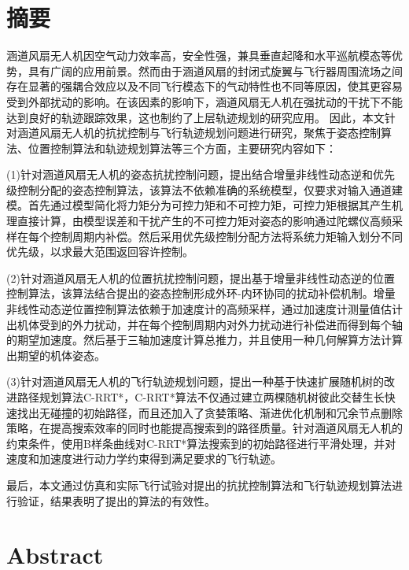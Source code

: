 \chapter{摘\texorpdfstring{\quad}{}要}

涵道风扇无人机因空气动力效率高，安全性强，兼具垂直起降和水平巡航模态等优势，具有广阔的应用前景。然而由于涵道风扇的封闭式旋翼与飞行器周围流场之间存在显著的强耦合效应以及不同飞行模态下的气动特性也不同等原因，使其更容易受到外部扰动的影响。在该因素的影响下，涵道风扇无人机在强扰动的干扰下不能达到良好的轨迹跟踪效果，这也制约了上层轨迹规划的研究应用。
因此，本文针对涵道风扇无人机的抗扰控制与飞行轨迹规划问题进行研究，聚焦于姿态控制算法、位置控制算法和轨迹规划算法等三个方面，主要研究内容如下：

(1)针对涵道风扇无人机的姿态抗扰控制问题，提出结合增量非线性动态逆和优先级控制分配的姿态控制算法，该算法不依赖准确的系统模型，仅要求对输入通道建模。首先通过模型简化将力矩分为可控力矩和不可控力矩，可控力矩根据其产生机理直接计算，由模型误差和干扰产生的不可控力矩对姿态的影响通过陀螺仪高频采样在每个控制周期内补偿。然后采用优先级控制分配方法将系统力矩输入划分不同优先级，以求最大范围返回容许控制。

(2)针对涵道风扇无人机的位置抗扰控制问题，提出基于增量非线性动态逆的位置控制算法，该算法结合提出的姿态控制形成外环-内环协同的扰动补偿机制。增量非线性动态逆位置控制算法依赖于加速度计的高频采样，通过加速度计测量值估计出机体受到的外力扰动，并在每个控制周期内对外力扰动进行补偿进而得到每个轴的期望加速度。然后基于三轴加速度计算总推力，并且使用一种几何解算方法计算出期望的机体姿态。

(3)针对涵道风扇无人机的飞行轨迹规划问题，提出一种基于快速扩展随机树的改进路径规划算法C-RRT*，C-RRT*算法不仅通过建立两棵随机树彼此交替生长快速找出无碰撞的初始路径，而且还加入了贪婪策略、渐进优化机制和冗余节点删除策略，在提高搜索效率的同时也能提高搜索到的路径质量。针对涵道风扇无人机的约束条件，使用B样条曲线对C-RRT*算法搜索到的初始路径进行平滑处理，并对速度和加速度进行动力学约束得到满足要求的飞行轨迹。

最后，本文通过仿真和实际飞行试验对提出的抗扰控制算法和飞行轨迹规划算法进行验证，结果表明了提出的算法的有效性。


\chapter{Abstract}

